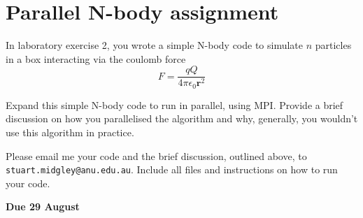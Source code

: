 \documentclass[12pt,a4paper,oneside,openany]{report}
\newcommand{\code}[1]{\texttt{#1}}
\begin{document}
\section*{Parallel N-body assignment}

In laboratory exercise 2, you wrote a simple N-body code to simulate $n$ particles in a box interacting via the coulomb force
\begin{equation}
F=\frac{q Q}{4\pi\epsilon_{0} \mathbf{r}^{2}}
\end{equation}

Expand this simple N-body code to run in parallel, using MPI.  Provide a brief discussion on how you parallelised the algorithm and why, generally, you wouldn't use this algorithm in practice.

Please email me your code and the brief discussion, outlined above, to \code{stuart.midgley@anu.edu.au}.  Include all files and instructions on how to run your code.

\textbf{Due 29 August}
\end{document}
